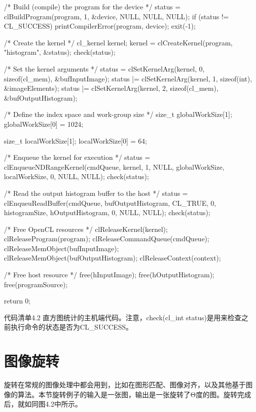 \begin{codebox}[cpp]
{  /* Build (compile) the program for the device */
  status = clBuildProgram(program, 1, &device, NULL, NULL, NULL);
  if (status != CL_SUCCESS){
    printCompilerError(program, device);
    exit(-1);
  }

  /* Create the kernel */
  cl_kernel kernel;
  kernel = clCreateKernel(program, "histogram", &status);
  check(status);

  /* Set the kernel arguments */
  status = clSetKernelArg(kernel, 0, sizeof(cl_mem), &bufInputImage);
  status |= clSetKernelArg(kernel, 1, sizeof(int), &imageElements);
  status |= clSetKernelArg(kernel, 2, sizeof(cl_mem), &bufOutputHistogram);

  /* Define the index space and work-group size */
  size_t globalWorkSize[1];
  globalWorkSize[0] = 1024;

  size_t localWorkSize[1];
  localWorkSize[0] = 64;

  /* Enqueue the kernel for execution */
  status = clEnqueueNDRangeKernel(cmdQueue, kernel, 1, NULL, globalWorkSize, localWorkSize, 0, NULL, NULL);
  check(status);

  /* Read the output histogram buffer to the host */
  status = clEnqueuReadBuffer(cmdQueue, bufOutputHistogram, CL_TRUE, 0, histogramSize, hOutputHistogram, 0, NULL, NULL);
  check(status);

  /* Free OpenCL resources */
  clReleaseKernel(kernel);
  clReleaseProgram(program);
  clReleaseCommandQueue(cmdQueue);
  clReleaseMemObject(bufInputImage);
  clReleaseMemObject(bufOutputHistogram);
  clReleaseContext(context);

  /* Free host resource */
  free(hInputImage);
  free(hOutputHistogram);
  free(programSource);

  return 0;
}
\end{codebox}

代码清单4.2 直方图统计的主机端代码。注意，check(cl\_\allowbreak{}int status)是用来检查之前执行命令的状态是否为CL\_\allowbreak{}SUCCESS。



\section{图像旋转}

旋转在常规的图像处理中都会用到，比如在图形匹配、图像对齐，以及其他基于图像的算法。本节旋转例子的输入是一张图，输出是一张旋转了Θ度的图。旋转完成后，就如同图4.2中所示。


